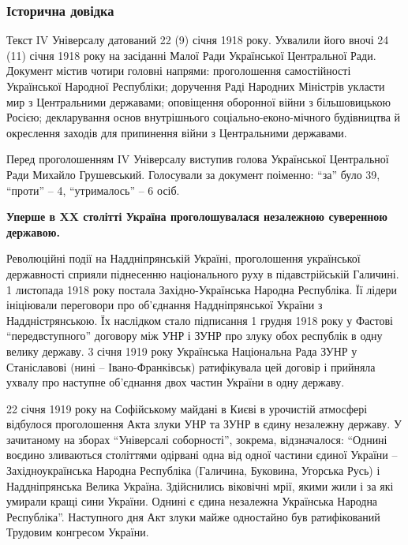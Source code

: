  
 
 
 
 

\subsubsection{Історична довідка}

Текст IV Універсалу датований 22 (9) січня 1918 року. Ухвалили його вночі 24
(11) січня 1918 року на засіданні Малої Ради Української Центральної Ради.
Документ містив чотири головні напрями: проголошення самостійності Української
Народної Республіки; доручення Раді Народних Міністрів укласти мир з
Центральними державами; оповіщення оборонної війни з більшовицькою Росією;
декларування основ внутрішнього соціально-еконо\hyp{}мічного будівництва й окреслення
заходів для припинення війни з Центральними державами.

Перед проголошенням IV Універсалу виступив голова Української Центральної Ради
Михайло Грушевський. Голосували за документ поіменно: \enquote{за} було 39, \enquote{проти}  –
4, \enquote{утрималось} – 6 осіб.

\textbf{Уперше в XX столітті Україна проголошувалася незалежною суверенною державою.}

Революційні події на Наддніпрянській Україні, проголошення української
державності сприяли піднесенню національного руху в підавстрійській Галичині. 1
листопада 1918 року постала Західно-Українська Народна Республіка. Її лідери
ініціювали переговори про об'єднання Наддніпрянської України з
Наддністрянською. Їх наслідком стало підписання 1 грудня 1918 року у Фастові
\enquote{передвступного} договору  між УНР і ЗУНР про злуку обох республік в одну
велику державу. 3 січня 1919 року Українська Національна Рада ЗУНР у
Станіславові (нині – Івано-Франківськ) ратифікувала цей договір і прийняла
ухвалу про наступне об'єднання двох частин України в одну державу.

22 січня 1919 року на Софійському майдані в Києві в урочистій атмосфері
відбулося проголошення Акта злуки УНР та ЗУНР в єдину незалежну державу. У
зачитаному на зборах \enquote{Універсалі соборності}, зокрема, відзначалося: \enquote{Однині
воєдино зливаються століттями одірвані одна від одної частини єдиної України –
Західноукраїнська Народна Республіка (Галичина, Буковина, Угорська Русь) і
Наддніпрянська Велика Україна. Здійснились віковічні мрії, якими жили і за які
умирали кращі сини України. Однині є єдина незалежна Українська Народна
Республіка}. Наступного дня Акт злуки майже одностайно був ратифікований
Трудовим конгресом України.

